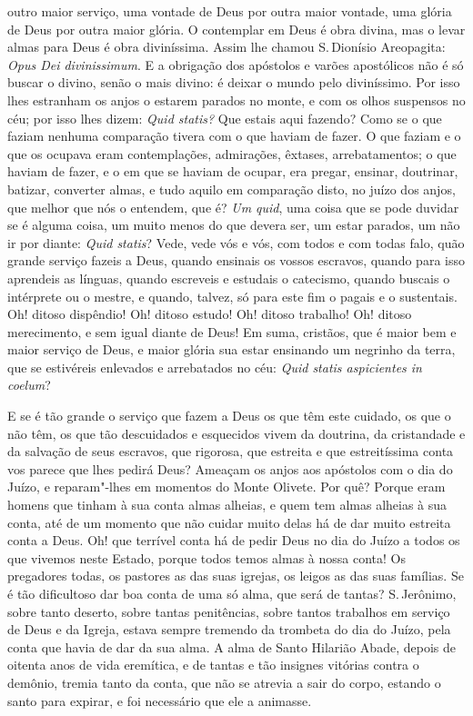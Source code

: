 outro maior serviço, uma vontade de Deus por outra maior vontade, uma
glória de Deus por outra maior glória. O contemplar em Deus é obra
divina, mas o levar almas para Deus é obra diviníssima.
Assim lhe chamou S.\,Dionísio Areopagita: \emph{Opus Dei divinissimum}. E
a obrigação dos apóstolos e varões apostólicos não é só buscar o divino,
senão o mais divino: é deixar o mundo pelo diviníssimo. Por isso lhes
estranham os anjos o estarem parados no monte, e com os olhos suspensos
no céu; por isso lhes dizem: \emph{Quid statis?} Que estais aqui
fazendo? Como se o que faziam nenhuma comparação tivera com o que
haviam de fazer. O que faziam e o que os ocupava eram contemplações,
admirações, êxtases, arrebatamentos; o que haviam de fazer, e o em que
se haviam de ocupar, era pregar, ensinar, doutrinar, batizar, converter
almas, e tudo aquilo em comparação disto, no juízo dos anjos, que melhor
que nós o entendem, que é? \emph{Um quid}, uma coisa que se pode duvidar
se é alguma coisa, um muito menos do que devera ser, um estar parados,
um não ir por diante: \emph{Quid statis}? Vede, vede vós e vós, com
todos e com todas falo,
quão grande serviço fazeis a Deus, quando ensinais os vossos
escravos, quando para isso aprendeis as línguas, quando escreveis e
estudais o catecismo, quando buscais o intérprete ou o mestre, e quando,
talvez, só para este fim o pagais e o sustentais. Oh! ditoso dispêndio!
Oh! ditoso estudo! Oh! ditoso trabalho! Oh! ditoso merecimento, e sem
igual diante de Deus! Em suma,
cristãos, que é maior bem e maior serviço de Deus, e maior glória sua
estar ensinando um negrinho da terra, que se estivéreis enlevados e
arrebatados no céu: \emph{Quid statis aspicientes in coelum}?

E se é tão grande o serviço que fazem a Deus os que têm este cuidado, os
que o não têm, os que tão descuidados e esquecidos vivem da doutrina, da
cristandade e da salvação de seus escravos, que rigorosa, que estreita e
que estreitíssima conta vos parece que lhes pedirá Deus? Ameaçam os
anjos aos apóstolos com o dia do Juízo, e reparam"-lhes em momentos do
Monte Olivete. Por quê? Porque eram homens que tinham à sua conta almas
alheias, e quem tem almas alheias à sua conta, até de um momento que não
cuidar muito delas há de dar muito estreita conta a Deus. Oh! que
terrível conta há de pedir Deus no dia do Juízo a todos os que vivemos
neste Estado, porque todos temos almas à nossa conta! Os pregadores
todas, os pastores as das suas igrejas, os leigos as das suas famílias.
Se é tão dificultoso dar boa conta de uma só alma, que será de tantas?
S.\,Jerônimo, sobre tanto deserto, sobre tantas penitências, sobre tantos
trabalhos em serviço de Deus e da Igreja, estava sempre tremendo da
trombeta do dia do Juízo, pela conta que havia de dar da sua alma. A
alma de Santo Hilarião Abade, depois de oitenta anos de vida eremítica,
e de tantas e tão insignes vitórias contra o demônio, tremia tanto da
conta, que não se atrevia a sair do corpo, estando o santo para expirar,
e foi necessário que ele a animasse.

